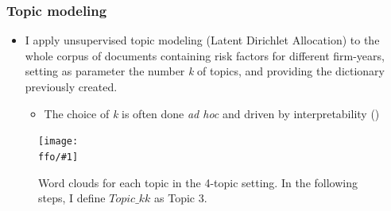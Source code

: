 \documentclass{beamer}
\newcommand{\ffo}{dicfullmc10thr10defnob40noa0_8_4t}
\newcommand{\insertfigure}[2]{
\begin{figure}[h!]
  \centering
  \texttt{[image: \\ffo/\#1]}
  \centering
  \captionsetup{font=scriptsize}
  \caption{#2}
  \label{fig:#1}
\end{figure}
}
\begin{document}
\begin{frame}
\frametitle{Topic modeling}
\begin{itemize}
\item I apply unsupervised topic modeling (Latent Dirichlet Allocation) to the whole corpus of documents containing risk factors for different firm-years, setting as parameter the number \textit{k} of topics, and providing the dictionary previously created.
\begin{itemize}
  \item The choice of \textit{k} is often done \textit{ad hoc} and driven by interpretability (\cite{Gentzkow2019-va})
\end{itemize}
\end{itemize}
\end{frame}

\begin{frame}
	\insertfigure{wordclouds}{Word clouds for each topic in the 4-topic setting. In the following steps, I define $Topic\_kk$ as Topic 3.}
\end{frame}

\end{document}
